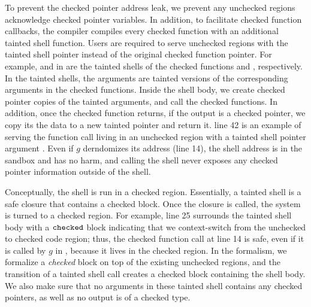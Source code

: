 To prevent the checked pointer address leak,
we prevent any unchecked regions acknowledge checked pointer variables.
In addition, to facilitate checked function callbacks, 
the \systemname compiler compiles every checked function
with an additional tainted shell function.
Users are required to serve unchecked regions with the tainted shell pointer instead of the original checked function pointer.
For example,  and  in  
are the tainted shells of the checked functions  and , respectively.
In the tainted shells, the arguments are tainted versions of the corresponding arguments in the checked functions.
Inside the shell body, we create checked pointer copies of the tainted arguments, and call the checked functions.
In addition, once the checked function returns,
if the output is a checked pointer, we copy its the data to a new tainted pointer and return it.
 line 42 is an example of serving the function call living in an unchecked region
with a tainted shell pointer argument .
Even if $g$ derndomizes its address (line 14), the shell address is in the sandbox and has no harm,
and calling the shell never exposes any checked pointer information outside of the shell.

Conceptually, the shell is run in a checked region.
Essentially, a tainted shell is a safe closure that contains a checked block.
Once the closure is called, the system is turned to a checked region.
For example,  line 25 surrounds the tainted shell body with a $\mathtt{checked}$ block indicating
that we context-switch from the unchecked to checked code region;
thus, the checked function call at  line 14 is safe, 
even if it is called by $g$ in  , because it lives in the checked region.
In the \systemname formalism, we formalize a \textit{checked} block on top of the existing unchecked regions,
and the transition of a tainted shell call creates a checked block containing the shell body.
We also make sure that no arguments in these tainted shell contains any checked pointers,
as well as no output is of a checked type.

  
